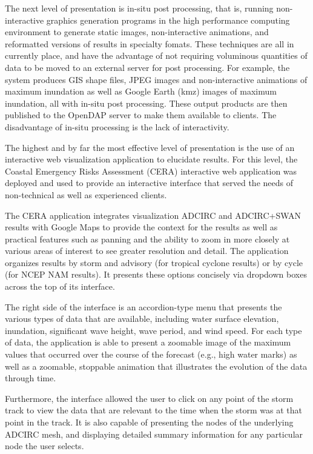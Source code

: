 \documentclass[12pt]{article}
\begin{document}
The next level of presentation is in-situ post processing, that is, 
running non-interactive graphics generation programs in the high 
performance computing environment to generate static images, 
non-interactive animations, and reformatted versions of results in 
specialty fomats. These techniques are all in currently place, and 
have the advantage of not requiring voluminous quantities of data to 
be moved to an external server for post processing. For example, the 
system produces GIS shape files, JPEG images and non-interactive 
animations of maximum inundation as well as Google Earth (kmz) 
images of maximum inundation, all with in-situ post processing. 
These output products are then published to the OpenDAP server to 
make them available to clients. The disadvantage of in-situ 
processing is the lack of interactivity. 

The highest and by far the most effective level of presentation is 
the use of an interactive web visualization application to elucidate 
results. For this level, the Coastal Emergency Risks Assessment 
(CERA) interactive web application was deployed and used to provide 
an interactive interface that served the needs of non-technical as 
well as experienced clients. 

The CERA application integrates visualization ADCIRC and ADCIRC+SWAN 
results with Google Maps to provide the context for the results as 
well as practical features such as panning and the ability to zoom 
in more closely at various areas of interest to see greater 
resolution and detail. The application organizes results by storm 
and advisory (for tropical cyclone results) or by cycle (for NCEP 
NAM results). It presents these options concisely via dropdown boxes 
across the top of its interface.

The right side of the interface is an accordion-type menu that 
presents the various types of data that are available, including 
water surface elevation, inundation, significant wave height, wave 
period, and wind speed. For each type of data, the application is 
able to present a zoomable image of the maximum values that occurred 
over the course of the forecast (e.g., high water marks) as well as 
a zoomable, stoppable animation that illustrates the evolution of 
the data through time. 

Furthermore, the interface allowed the user to click on any point of 
the storm track to view the data that are relevant to the time when 
the storm was at that point in the track. It is also capable of 
presenting the nodes of the underlying ADCIRC mesh, and displaying 
detailed summary information for any particular node the user 
selects. 
\end{document}
